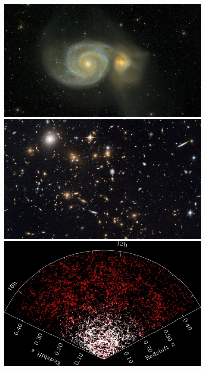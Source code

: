 \documentclass{beamer}
\begin{document}
{\begin{columns}
\begin{column}{0.5\textwidth}
\begin{itemize}
            \end{itemize}
        \end{column}
        \begin{column}{0.5\textwidth}    
            \begin{center}
                \includegraphics[width=0.8\textwidth]{M51-4x4-crop.jpg}
                \includegraphics[width=0.8\textwidth]{macs-cluster-crop.jpg}
                \includegraphics[width=0.8\textwidth]{sdss-gals-blanton.jpg}
            \end{center}
        \end{column}
    \end{columns}
}
\end{document}
